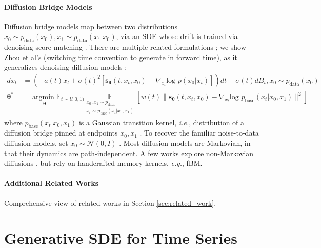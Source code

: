 \documentclass{article}
\begin{document}
\paragraph{Diffusion Bridge Models}
Diffusion bridge models map between two distributions $x_0 \sim p_\text{data}(x_0), x_1 \sim p_\text{data}(x_1 | x_0)$, via an SDE whose drift is trained via denoising score matching \cite{vincent2011connection}. There are multiple related formulations \cite{zhou2023denoising, liu2022let, albergo2023stochastic, peluchetti2023diffusion, peluchetti2023non}; we show Zhou et al's \cite{zhou2023denoising} (switching time convention to generate in forward time), as it generalizes denoising diffusion models \cite{song2020score, song2019generative}:
\begin{align}
    dx_t &= \left(-a(t)x_t + \sigma(t)^2 \left[\mathbf{s_\theta}(t, x_t, x_0) - \nabla_{x_t}\text{log } p(x_0 | x_t)\right]\right)dt + \sigma(t)dB_t, x_0 \sim p_\text{data}(x_0) \label{eqn:trad_diffusion_bridge} \\
    \mathbf{\theta^*} &= \underset{\mathbf{\theta}}{\text{argmin }}\mathbb{E}_{t \sim \mathcal{U}[0, 1)}\underset{\substack{x_0, x_1 \sim p_\text{data} \\ x_t \sim p_\text{base}(x_t | x_0, x_1)}}{\mathbb{E}}\left[w(t)\|\mathbf{s_\theta}(t, x_t, x_0) - \nabla_{x_t}\text{log } p_\text{base}(x_t | x_0, x_1)\|^2\right] \label{eqn:trad_dsm}
\end{align}
where $p_\text{base}(x_t | x_0, x_1)$ is a Gaussian transition kernel, \textit{i.e.}, distribution of a diffusion bridge pinned at endpoints $x_0, x_1$ \cite{zhou2023denoising, steele2001stochastic}.
To recover the familiar noise-to-data diffusion models, set $x_0 \sim \mathcal{N}(0, I)$ \cite{song2020score, song2019generative}.
Most diffusion models are Markovian, in that their dynamics are path-independent. A few works explore non-Markovian diffusions \cite{nobis2024generative, nobis2025fractional}, but rely on handcrafted memory kernels, \textit{e.g.}, fBM.

\paragraph{Additional Related Works} Comprehensive view of related works in Section \ref{sec:related_work}.


\section{Generative SDE for Time Series}
\end{document}
